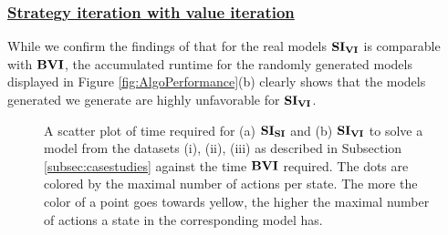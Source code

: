 \subsubsection*{\underline{Strategy iteration with value iteration}}
While we confirm the findings of \cite{gandalf} that for the real models $\SI$ is comparable with $\BVI$, 
the accumulated runtime for the randomly generated models displayed in Figure \ref{fig:AlgoPerformance}(b) clearly shows that 
the models generated we generate are highly unfavorable for $\SI$.

\begin{figure}[h!]
    \centering
    \caption[$\SI$ and $\SISI$ compared to $\BVI$ based on the maximal number of actions per state]{
        A scatter plot of time required for (a) $\SISI$ and (b) $\SI$ to solve a model from the datasets (i), (ii), (iii) as described in Subsection \ref{subsec:casestudies} 
        against the time $\BVI$ required.
        The dots are colored by the maximal number of actions per state.
        The more the color of a point goes towards yellow, the higher the maximal number of actions a state in the corresponding model has.
    }
    \label{fig:colorScatterSi}
\end{figure}

